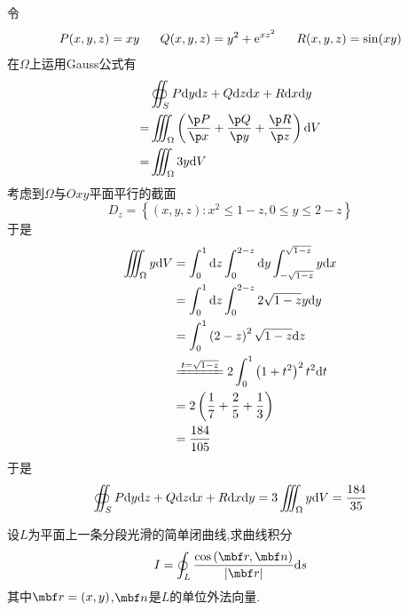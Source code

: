 \documentclass{ctexart}
\begin{document}
\begin{solution}
    令
    \[P(x,y,z)=xy\ \ \ \ \ Q(x,y,z)=y^2+\e^{xz^2}\ \ \ \ \ R(x,y,z)=\sin(xy)\]
    在$\Omega$上运用Gauss公式有
    \[\begin{aligned}
        &\oiint_SP\di y\di z+Q\di z\dx+R\dx\di y \\
        =&\iiint_{\Omega}\left(\dfrac{\p P}{\p x}+\dfrac{\p Q}{\p y}+\dfrac{\p R}{\p z}\right)\di V \\
        =&\iiint_{\Omega}3y\di V
    \end{aligned}\]
    考虑到$\Omega$与$Oxy$平面平行的截面
    \[D_z=\left\{(x,y,z):x^2\leqslant 1-z,0\leqslant y\leqslant 2-z\right\}\]
    于是
    \[\begin{aligned}
        \iiint_{\Omega}y\di V
        &= \int_0^1\di z\int_0^{2-z}\di y\int_{-\sqrt{1-z}}^{\sqrt{1-z}}y\dx \\
        &= \int_0^1\di z\int_0^{2-z}2\sqrt{1-z}y\di y \\
        &= \int_0^1\left(2-z\right)^2\sqrt{1-z}\di z \\
        &\xlongequal{t=\sqrt{1-z}}2\int_0^1\left(1+t^2\right)^2t^2\di t \\
        &= 2\left(\dfrac17+\dfrac{2}{5}+\dfrac13\right) \\
        &= \dfrac{184}{105}
    \end{aligned}\]
    于是
    \[\oiint_SP\mathrm{d} y\mathrm{d} z+Q\mathrm{d} z\mathrm{d} x+R\mathrm{d} x\mathrm{d} y=3\iiint_{\Omega}y\mathrm{d} V=\dfrac{184}{35}\]

\end{solution}
\begin{problem}[6.(10\songti{分})]
    设$L$为平面上一条分段光滑的简单闭曲线,求曲线积分
    \[I=\oint_{L}\dfrac{\cos\left(\mbf r,\mbf n\right)}{\left|\mbf r\right|}\di s\]
    其中$\mbf r=(x,y)$,$\mbf n$是$L$的单位外法向量.
\end{problem}
\end{document}
